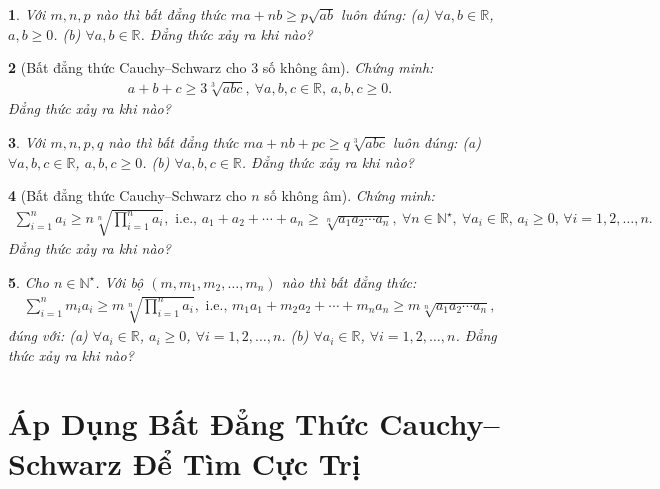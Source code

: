 \documentclass{article}
\newtheorem{baitoan}{}
\begin{document}
\begin{baitoan}
	Với $m,n,p$ nào thì bất đẳng thức $ma + nb\ge p\sqrt{ab}$ luôn đúng: (a) $\forall a,b\in\mathbb{R}$, $a,b\ge0$. (b) $\forall a,b\in\mathbb{R}$. Đẳng thức xảy ra khi nào?
\end{baitoan}

\begin{baitoan}[Bất đẳng thức Cauchy--Schwarz cho 3 số không âm]
	Chứng minh:
	\begin{align*}
		\boxed{a + b + c\ge3\sqrt[3]{abc},\ \forall a,b,c\in\mathbb{R},\,a,b,c\ge 0.}
	\end{align*}
	Đẳng thức xảy ra khi nào?
\end{baitoan}

\begin{baitoan}
	Với $m,n,p,q$ nào thì bất đẳng thức $ma + nb + pc\ge q\sqrt[3]{abc}$ luôn đúng: (a) $\forall a,b,c\in\mathbb{R}$, $a,b,c\ge0$. (b) $\forall a,b,c\in\mathbb{R}$. Đẳng thức xảy ra khi nào?
\end{baitoan}

\begin{baitoan}[Bất đẳng thức Cauchy--Schwarz cho $n$ số không âm]
	Chứng minh:
	\begin{align*}
		\sum_{i=1}^n a_i\ge n\sqrt[n]{\prod_{i=1}^n a_i},\mbox{ i.e., } a_1 + a_2 + \cdots + a_n\ge\sqrt[n]{a_1a_2\cdots a_n},\ \forall n\in\mathbb{N}^\star,\ \forall a_i\in\mathbb{R},\,a_i\ge0,\,\forall i = 1,2,\ldots,n.
	\end{align*}
	Đẳng thức xảy ra khi nào?
\end{baitoan}

\begin{baitoan}
	Cho $n\in\mathbb{N}^\star$. Với bộ $(m,m_1,m_2,\ldots,m_n)$ nào thì bất đẳng thức:
	\begin{align*}
		\sum_{i=1}^n m_ia_i\ge m\sqrt[n]{\prod_{i=1}^n a_i},\mbox{ i.e., } m_1a_1 + m_2a_2 + \cdots + m_na_n\ge m\sqrt[n]{a_1a_2\cdots a_n},
	\end{align*}
	đúng với: (a) $\forall a_i\in\mathbb{R}$, $a_i\ge0$, $\forall i = 1,2,\ldots,n$. (b) $\forall a_i\in\mathbb{R}$, $\forall i = 1,2,\ldots,n$.
	Đẳng thức xảy ra khi nào?
\end{baitoan}



\section{Áp Dụng Bất Đẳng Thức Cauchy--Schwarz Để Tìm Cực Trị}
\end{document}
